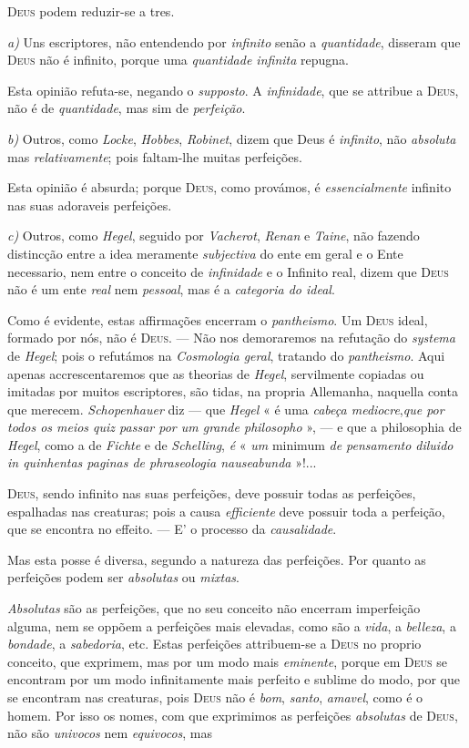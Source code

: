 \textsc{Deus} podem reduzir-se a tres.\par \emph{a)} Uns escriptores, não entendendo por \emph{infinito} senão a \emph{quantidade}, disseram que \textsc{Deus} não é infinito, porque uma \emph{quantidade infinita} repugna.\par Esta opinião refuta-se, negando o \emph{supposto}. A \emph{infinidade}, que se attribue a \textsc{Deus}, não é de \emph{quantidade}, mas sim de \emph{perfeição}.\par \emph{b)} Outros, como \emph{Locke}, \emph{Hobbes}, \emph{Robinet}, dizem que Deus é \emph{infinito}, não \emph{absoluta} mas \emph{relativamente}; pois faltam-lhe muitas perfeições.\par Esta opinião é absurda; porque \textsc{Deus}, como provámos, é \emph{essencialmente} infinito nas suas adoraveis perfeições.\par \emph{c)} Outros, como \emph{Hegel}, seguido por \emph{Vacherot}, \emph{Renan} e \emph{Taine}, não fazendo distincção entre a idea meramente \emph{subjectiva} do ente em geral e o Ente necessario, nem entre o conceito de \emph{infinidade} e o Infinito real, dizem que \textsc{Deus} não é um ente \emph{real} nem \emph{pessoal}, mas é a \emph{categoria do ideal}.\par Como é evidente, estas affirmações encerram o \emph{pantheismo}. Um \textsc{Deus} ideal, formado por nós, não é \textsc{Deus}. --- Não nos demoraremos na refutação do \emph{systema} de \emph{Hegel}; pois o refutámos na \emph{Cosmologia geral}, tratando do \emph{pantheismo}. Aqui apenas accrescentaremos que as theorias de \emph{Hegel}, servilmente copiadas ou imitadas por muitos escriptores, são tidas, na propria Allemanha, naquella conta que merecem. \emph{Schopenhauer} diz --- que \emph{Hegel} « é uma \emph{cabeça mediocre},\emph{que por todos os meios quiz passar por um grande philosopho} », --- e que a philosophia de \emph{Hegel}, como a de \emph{Fichte} e de \emph{Schelling}, \emph{é} « \emph{um} minimum \emph{de pensamento diluido in quinhentas paginas de phraseologia nauseabunda} »!...\par \textsc{Deus}, sendo infinito nas suas perfeições, deve possuir todas as perfeições, espalhadas nas creaturas; pois a causa \emph{efficiente} deve possuir toda a perfeição, que se encontra no effeito. --- E' o processo da \emph{causalidade}.\par Mas esta posse é diversa, segundo a natureza das perfeições. Por quanto as perfeições podem ser \emph{absolutas} ou \emph{mixtas}.\par \emph{Absolutas} são as perfeições, que no seu conceito não encerram imperfeição alguma, nem se oppõem a perfeições mais elevadas, como são a \emph{vida}, a \emph{belleza}, a \emph{bondade}, a \emph{sabedoria}, etc. Estas perfeições attribuem-se a \textsc{Deus} no proprio conceito, que exprimem, mas por um modo mais \emph{eminente}, porque em \textsc{Deus} se encontram por um modo infinitamente mais perfeito e sublime do modo, por que se encontram nas creaturas, pois \textsc{Deus} não é \emph{bom}, \emph{santo}, \emph{amavel}, como é o homem. Por isso os nomes, com que exprimimos as perfeições \emph{absolutas} de \textsc{Deus}, não são \emph{univocos} nem \emph{equivocos}, mas 